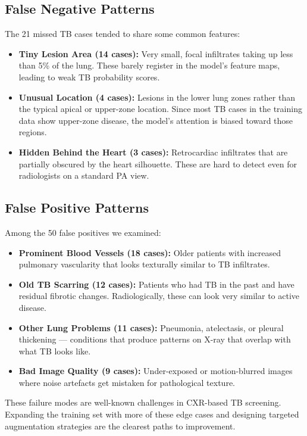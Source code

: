 \documentclass[12pt]{report}
\begin{document}
\subsection{False Negative Patterns}
The 21 missed TB cases tended to share some common features:
\begin{itemize}
    \item \textbf{Tiny Lesion Area (14 cases):} Very small, focal infiltrates taking up less than 5\% of the lung. These barely register in the model's feature maps, leading to weak TB probability scores.
    \item \textbf{Unusual Location (4 cases):} Lesions in the lower lung zones rather than the typical apical or upper-zone location. Since most TB cases in the training data show upper-zone disease, the model's attention is biased toward those regions.
    \item \textbf{Hidden Behind the Heart (3 cases):} Retrocardiac infiltrates that are partially obscured by the heart silhouette. These are hard to detect even for radiologists on a standard PA view.
\end{itemize}

\subsection{False Positive Patterns}
Among the 50 false positives we examined:
\begin{itemize}
    \item \textbf{Prominent Blood Vessels (18 cases):} Older patients with increased pulmonary vascularity that looks texturally similar to TB infiltrates.
    \item \textbf{Old TB Scarring (12 cases):} Patients who had TB in the past and have residual fibrotic changes. Radiologically, these can look very similar to active disease.
    \item \textbf{Other Lung Problems (11 cases):} Pneumonia, atelectasis, or pleural thickening --- conditions that produce patterns on X-ray that overlap with what TB looks like.
    \item \textbf{Bad Image Quality (9 cases):} Under-exposed or motion-blurred images where noise artefacts get mistaken for pathological texture.
\end{itemize}

These failure modes are well-known challenges in CXR-based TB screening. Expanding the training set with more of these edge cases and designing targeted augmentation strategies are the clearest paths to improvement.
\end{document}
